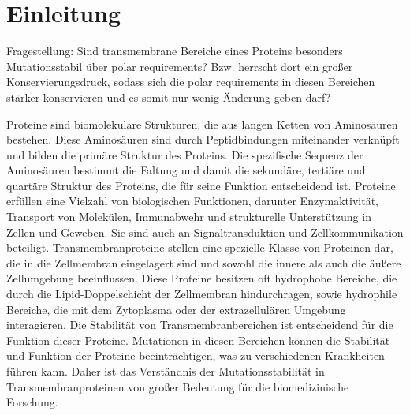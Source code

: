 \documentclass[german,version-2022-01]{uzl-thesis}
\begin{document}
%
%


\chapter{Einleitung}


%
Fragestellung: Sind transmembrane Bereiche eines Proteins besonders Mutationsstabil \"uber polar requirements? Bzw. herrscht dort ein gro\ss{}er Konservierungsdruck, sodass sich die polar requirements in diesen Bereichen st\"arker konservieren und es somit nur wenig \"Anderung geben darf? 

Proteine sind biomolekulare Strukturen, die aus langen Ketten von Aminos\"auren bestehen. Diese Aminos\"auren sind durch Peptidbindungen miteinander verkn\"upft und bilden die prim\"are Struktur des Proteins. Die spezifische Sequenz der Aminos\"auren bestimmt die Faltung und damit die sekund\"are, terti\"are und quart\"are Struktur des Proteins, die f\"ur seine Funktion entscheidend ist. Proteine erf\"ullen eine Vielzahl von biologischen Funktionen, darunter Enzymaktivit\"at, Transport von Molek\"ulen, Immunabwehr und strukturelle Unterst\"utzung in Zellen und Geweben. Sie sind auch an Signaltransduktion und Zellkommunikation beteiligt. Transmembranproteine stellen eine spezielle Klasse von Proteinen dar, die in die Zellmembran eingelagert sind und sowohl die innere als auch die \"au\ss{}ere Zellumgebung beeinflussen. Diese Proteine besitzen oft hydrophobe Bereiche, die durch die Lipid-Doppelschicht der Zellmembran hindurchragen, sowie hydrophile Bereiche, die mit dem Zytoplasma oder der extrazellul\"aren Umgebung interagieren. Die Stabilit\"at von Transmembranbereichen ist entscheidend f\"ur die Funktion dieser Proteine. Mutationen in diesen Bereichen k\"onnen die Stabilit\"at und Funktion der Proteine beeintr\"achtigen, was zu verschiedenen Krankheiten f\"uhren kann. Daher ist das Verst\"andnis der Mutationsstabilit\"at in Transmembranproteinen von gro\ss{}er Bedeutung f\"ur die biomedizinische Forschung.
\end{document}
